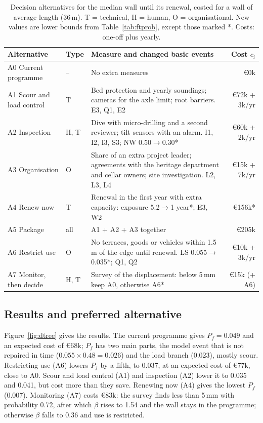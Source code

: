 \begin{table}[htbp]
\centering
\caption{Decision alternatives for the median wall until its renewal, costed for a wall of average length (36\,m).
T = technical, H = human, O = organisational. New values are lower bounds from
Table~\ref{tab:ftprob}, except those marked *. Costs: one-off plus yearly.}
\label{tab:interventions}
\small
\begin{tabularx}{\textwidth}{@{}llXr@{}}
\toprule
Alternative & Type & Measure and changed basic events & Cost $c_i$ \\
\midrule
A0 Current programme & -- & No extra measures & \euro0k \\
A1 Scour and load control & T & Bed protection and yearly soundings; cameras for the axle limit; root barriers. E3, Q1, E2 & \euro72k + 3k/yr \\
A2 Inspection & H, T & Dive with micro-drilling and a second reviewer; tilt sensors with an alarm. I1, I2, I3, S3; NW 0.50$\to$0.30* & \euro60k + 2k/yr \\
A3 Organisation & O & Share of an extra project leader; agreements with the heritage department and cellar owners; site investigation. L2, L3, L4 & \euro15k + 7k/yr \\
A4 Renew now & T & Renewal in the first year with extra capacity: exposure 5.2$\to$1 year*; E3, W2 & \euro156k* \\
A5 Package & all & A1 + A2 + A3 together & \euro205k \\
A6 Restrict use & O & No terraces, goods or vehicles within 1.5\,m of the edge until renewal. LS 0.055$\to$0.035*; Q1, Q2 & \euro10k + 3k/yr \\
A7 Monitor, then decide & H, T & Survey of the displacement: below 5\,mm keep A0, otherwise A6* & \euro15k (+ A6) \\
\bottomrule
\end{tabularx}
\end{table}

\subsection{Results and preferred alternative}\label{sec:to-results}

Figure~\ref{fig:dtree} gives the results. The
current programme gives $P_f = 0.049$ and an expected cost of \euro68k; $P_f$
has two main parts, the model event that is not repaired in time
($0.055 \times 0.48 = 0.026$) and the load branch (0.023), mostly scour.
Restricting use (A6) lowers $P_f$ by a fifth, to 0.037, at an expected cost of
\euro77k, close to A0. Scour and load control (A1) and inspection (A2) lower it
to 0.035 and 0.041, but cost more than they save. Renewing now (A4) gives the
lowest $P_f$ (0.007). Monitoring (A7) costs \euro83k: the survey finds less
than 5\,mm with probability 0.72, after which $\beta$ rises to 1.54 and the
wall stays in the programme; otherwise $\beta$ falls to 0.36 and use is
restricted.

